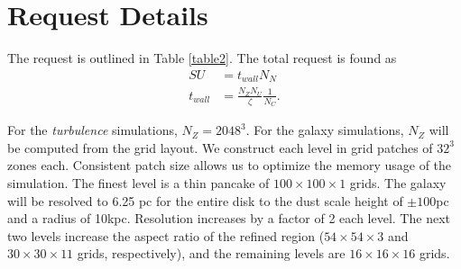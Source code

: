 

\section{Request Details}

The request is outlined in Table \ref{table2}.
The total request is found as
\begin{align}
SU &= t_{wall} N_N\\
t_{wall} &= \frac{N_Z N_U}{\zeta} \frac{1}{N_C}.
\end{align}

For the \emph{turbulence} simulations, $N_Z=2048^3$.  For the galaxy
simulations, $N_Z$ will be computed from the grid layout.  We construct each level in grid patches of $32^3$ zones each.  
Consistent patch size allows us to optimize the memory usage of the simulation.
The finest level is a thin pancake of
$100\times100\times1$ grids. The galaxy will be  resolved to 6.25 pc for 
the entire disk to the dust scale height of $\pm 100$pc and a radius of 10kpc.
Resolution increases by a factor of 2 each level.  The next two levels increase
the aspect ratio of the refined region ($54\times54\times3$ and
$30\times30\times11$ grids, respectively), and the remaining levels are $16\times 16 \times 16$
grids.  


